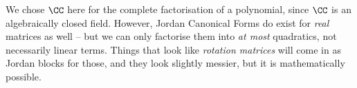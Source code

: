 \begin{remark}
    We chose \(\CC\) here for the complete factorisation of a polynomial, since \(\CC\) is an algebraically closed field. However, Jordan Canonical Forms do exist for \emph{real} matrices as well -- but we can only factorise them into \emph{at most} quadratics, not necessarily linear terms. Things that look like \emph{rotation matrices} will come in as Jordan blocks for those, and they look slightly messier, but it is mathematically possible.
\end{remark}